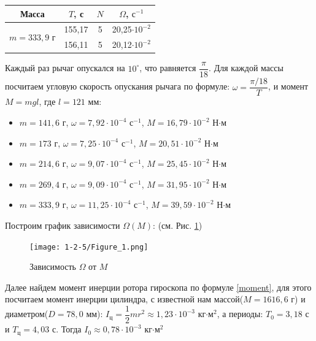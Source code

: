 \documentclass[a4paper, 12pt]{article}
\begin{document}
	\begin{center}
		\begin{tabular}{|c|c|c|c|}
			\hline
			Масса & $T$, с& $N$ &$\Omega$, $\text{с}^{-1}$ \\
			\hline
			\multirow{2}{*}{$m = 333,9$ г}&155,17&5&20,25$\cdot 10^{-2}$ \\
			\cline{2-4}
			&156,11 & 5 &20,12$\cdot 10^{-2}$  \\
			\hline
		\end{tabular}
	\end{center}
    Каждый раз рычаг опускался на $10^\circ$, что равняется $\dfrac{\pi}{18}$. Для каждой массы посчитаем угловую скорость опускания рычага по формуле: $\omega = \dfrac{\pi/18}{T}$, и момент $M = mgl$, где $l = 121$ мм:
	\begin{itemize}
		\item $m = 141,6$ г, $\omega = 7,92\cdot 10^{-4}$ $\text{с}^{-1}$, $M = 16,79\cdot10^{-2}$ Н$\cdot$м
		\item $m = 173$ г, $\omega = 7,25\cdot 10^{-4}$ $\text{с}^{-1}$, $M = 20,51\cdot10^{-2}$ Н$\cdot$м
		\item $m = 214,6$ г, $\omega = 9,07\cdot 10^{-4}$ $\text{с}^{-1}$, $M = 25,45\cdot10^{-2}$ Н$\cdot$м
		\item $m = 269,4$ г, $\omega = 9,09\cdot 10^{-4}$ $\text{с}^{-1}$, $M = 31,95\cdot10^{-2}$ Н$\cdot$м
		\item $m = 333,9$ г, $\omega = 11,25\cdot 10^{-4}$ $\text{с}^{-1}$, $M = 39,59\cdot10^{-2}$ Н$\cdot$м
	\end{itemize}
    Построим график зависимости $\Omega(M)$: (см. Рис. \ref{graph})\newline
	\begin{figure}[h!]
		\texttt{[image: 1-2-5/Figure\_1.png]}
		\caption{Зависимость $ \Omega $ от $ M $}
		\label{graph}
	\end{figure}
	Далее найдем момент инерции ротора гироскопа по формуле \eqref{moment}, для этого посчитаем момент инерции цилиндра, с известной нам массой($M = 1616,6$ г) и диаметром($D = 78,0$ мм): $I_\text{ц} = \dfrac{1}{2}mr^2 \approx 1,23\cdot 10^{-3}$ кг$\cdot \text{м}^2$, а периоды: $T_0 = 3,18$ с и $T_\text{ц} = 4,03$ с. Тогда $I_0 \approx 0,78\cdot 10^{-3}$ кг$\cdot \text{м}^2$
	
\end{document}
